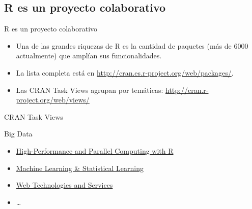 \documentclass[xcolor={usenames,svgnames,dvipsnames}]{beamer}
\begin{document}
\subsection{R es un proyecto colaborativo}
\label{sec-1-3}
\begin{frame}[label=sec-1-3-1]{R es un proyecto colaborativo}
\begin{itemize}
\item Una de las grandes riquezas de R es la cantidad de paquetes (más de 6000 actualmente) que amplían sus funcionalidades.
\item La lista completa está en \url{http://cran.es.r-project.org/web/packages/}.
\item Las CRAN Task Views agrupan por temáticas: \url{http://cran.r-project.org/web/views/}
\end{itemize}
\end{frame}

\begin{frame}[label=sec-1-3-2]{CRAN Task Views}
\begin{block}{Big Data}
\begin{itemize}
\item \href{http://cran.es.r-project.org/web/views/HighPerformanceComputing.html}{High-Performance and Parallel Computing with R}
\item \href{http://cran.es.r-project.org/web/views/MachineLearning.html}{Machine Learning \& Statistical Learning}
\item \href{http://cran.es.r-project.org/web/views/WebTechnologies.html}{Web Technologies and Services}
\item \ldots{}
\end{itemize}
\end{block}
\end{frame}
\end{document}
